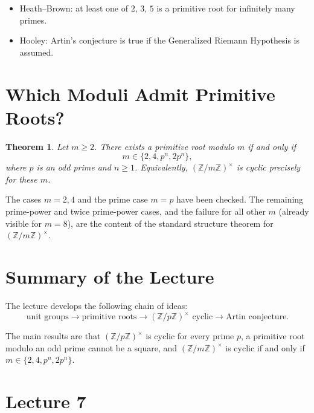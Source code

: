 \documentclass[11pt]{article}
\newtheorem{theorem}{Theorem}[section]
\theoremstyle{remark}
\newcommand{\Z}{\mathbb Z}
\newcommand{\units}[1]{\left(\mathbb Z/#1\mathbb Z\right)^\times}
\begin{document}
\begin{itemize}
    \item Heath--Brown: at least one of $2$, $3$, $5$ is a primitive root for
    infinitely many primes.

    \item Hooley: Artin's conjecture is true if the Generalized Riemann
    Hypothesis is assumed.
\end{itemize}

\section{Which Moduli Admit Primitive Roots?}

\begin{theorem}
Let $m\ge 2$. There exists a primitive root modulo $m$ if and only if
\[
    m\in\{2,4,p^n,2p^n\},
\]
where $p$ is an odd prime and $n\ge 1$. Equivalently, $\units m$ is cyclic
precisely for these $m$.
\end{theorem}

The cases $m=2,4$ and the prime case $m=p$ have been checked. The remaining
prime-power and twice prime-power cases, and the failure for all other $m$
(already visible for $m=8$), are the content of the standard structure
theorem for $\units m$.

\section*{Summary of the Lecture}

The lecture develops the following chain of ideas:
\[
\boxed{
\text{unit groups}
\longrightarrow
\text{primitive roots}
\longrightarrow
(\Z/p\Z)^\times\text{ cyclic}
\longrightarrow
\text{Artin conjecture}
}.
\]

The main results are that $\units p$ is cyclic for every prime $p$, a
primitive root modulo an odd prime cannot be a square, and $\units m$ is
cyclic if and only if $m\in\{2,4,p^n,2p^n\}$.

\clearpage

\section*{Lecture 7}
\end{document}
